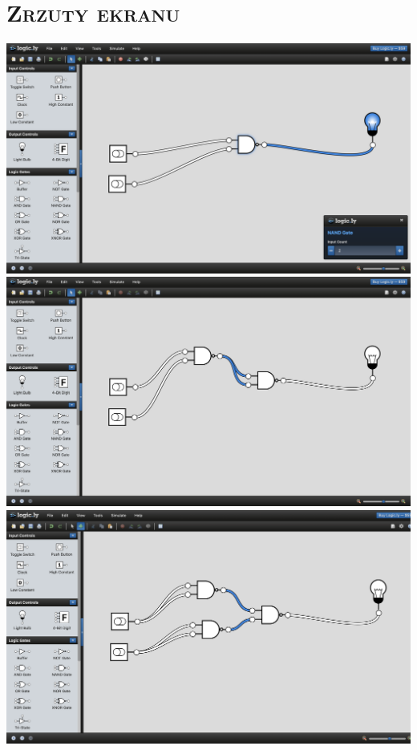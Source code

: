 \documentclass[,a4paper,12pt]{article}
\begin{document}
\section{\textsc{Zrzuty ekranu}}\par
    \includegraphics[width= 0.95\linewidth]{Zrzut ekranu 2025-01-25 o 22.20.30.png}\\ 
    \includegraphics[width= 0.95\linewidth]{Zrzut ekranu 2025-01-25 o 22.20.16.png}\\
    \includegraphics[width= 0.95\linewidth]{Zrzut ekranu 2025-01-25 o 22.19.33.png}
    
    
\end{document}
